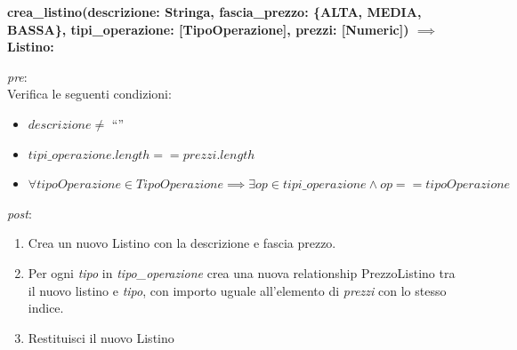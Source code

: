 \textbf{crea\_listino(descrizione: Stringa, fascia\_prezzo: \{ALTA, MEDIA,\\BASSA\}, tipi\_operazione: [TipoOperazione], prezzi: [Numeric]) $\implies$ Listino:}

\textit{pre}:\\
\hspace*{0.5 cm}Verifica le seguenti condizioni:
\begin{itemize}
  \item $descrizione \neq$ ``''
  \item $tipi\_operazione.length == prezzi.length$
  \item $\forall tipoOperazione \in Tipo Operazione \implies \exists op \in tipi\_operazione \land op == tipoOperazione $
\end{itemize}
\textit{post}:
\begin{enumerate}
  \item Crea un nuovo Listino con la descrizione e fascia prezzo.
  \item Per ogni \textit{tipo} in \textit{tipo\_operazione} crea una nuova relationship PrezzoListino tra il nuovo listino e \textit{tipo},
    con importo uguale all'elemento di \textit{prezzi} con lo stesso indice.
  \item Restituisci il nuovo Listino
\end{enumerate}
